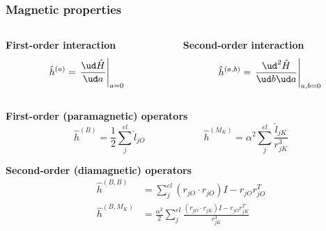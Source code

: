 \begin{frame}
    \frametitle{Magnetic properties}
    \begin{columns}
    \begin{column}[b]{0.48\linewidth}
        \centering
        \textbf{First-order interaction}
        \begin{equation}
            \nonumber
            \hat{h}^{(a)} = 
            \left. \frac{\ud \hat{H}}{\ud a}\right|_{a=0}
        \end{equation}
    \end{column}

    \begin{column}[b]{0.48\linewidth}
        \centering
        \textbf{Second-order interaction}
        \begin{equation}
            \nonumber
            \hat{h}^{(a,b)} = 
            \left. \frac{\ud^2 \hat{H}}{\ud b \ud a}\right|_{a,b=0}
        \end{equation}
    \end{column}
    \end{columns}

    \vspace{5mm}

    \pause
    \centering
    \textbf{First-order (paramagnetic) operators}
    \begin{equation}
        \nonumber
        \hat{h}^{(B)} = \frac{1}{2}\sum_j^{el} \hat{l}_{jO} \qquad \qquad \qquad
        \hat{h}^{(M_K)} = \alpha^2 \sum_j^{el} \frac{\hat{l}_{jK}}{r_{jK}^3}
    \end{equation}

    \vspace{5mm}

    \pause
    \textbf{Second-order (diamagnetic) operators}
    \begin{align}
        \nonumber
        \hat{h}^{(B,B)} &= 
        \sum_j^{el} \left(r_{jO}\cdot r_{jO}\right)I - r_{jO}r_{jO}^T\\
        \nonumber
        \hat{h}^{(B,M_K)} &= \frac{\alpha^2}{2} 
        \sum_j^{el} \frac{\left(r_{jO}\cdot r_{jK}\right)I -
        r_{jO}r_{jK}^T}{r_{jK}^3}
    \end{align}
\end{frame}

